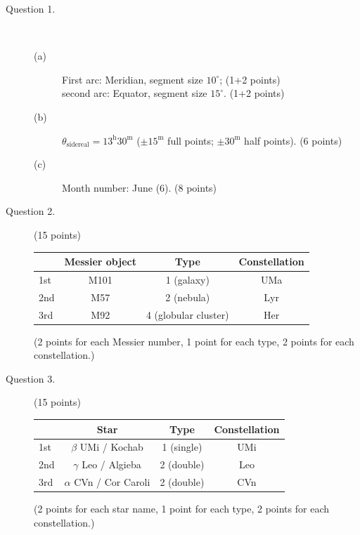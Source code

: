 \begin{description}
\item[Question 1.]~
  \begin{description}
  \item[(a)] First arc: Meridian, segment size $10^\circ$;
    \hfill(1+2 points)\\
    second arc: Equator, segment size $15^\circ$. \hfill(1+2 points)
  \item[(b)] $\theta_{\mathrm{sidereal}} = 13^{\mathrm{h}}30^{\mathrm{m}}$
    ($\pm 15^{\mathrm{m}}$ full points; $\pm 30^{\mathrm{m}}$ half points).
    \hfill(6 points)
  \item[(c)] Month number: June (6). \hfill(8 points)
  \end{description}
\item[Question 2.] (15 points)

  \begin{center}
  \begin{tabular}{lccc}
  & Messier object & Type & Constellation \\
  \hline
  1st & M101 & 1 (galaxy) & UMa \\
  2nd & M57 & 2 (nebula) & Lyr \\
  3rd & M92 & 4 (globular cluster) & Her \\
  \end{tabular}
  \end{center}

  (2 points for each Messier number, 1 point for each type, 2 points for
  each constellation.)
\item[Question 3.] (15 points)

  \begin{center}
  \begin{tabular}{lccc}
  & Star & Type & Constellation \\
  \hline
  1st & $\beta$ UMi / Kochab & 1 (single) & UMi \\
  2nd & $\gamma$ Leo / Algieba & 2 (double) & Leo \\
  3rd & $\alpha$ CVn / Cor Caroli & 2 (double) & CVn \\
  \end{tabular}
  \end{center}

  (2 points for each star name, 1 point for each type, 2 points for each
  constellation.)
\end{description}
